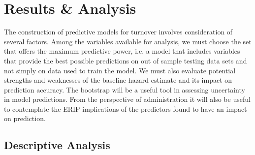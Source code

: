 \documentclass[12pt,letterpaper]{article}
\begin{document}
\section{Results \& Analysis} \label{application}
The construction of predictive models for turnover involves consideration of several factors. Among the variables available for analysis, we must choose the set that offers the maximum predictive power, i.e. a model that includes variables that provide the best possible predictions on out of sample testing data sets and not simply on data used to train the model. We must also evaluate potential strengths and weaknesses of the baseline hazard estimate and its impact on prediction accuracy.  The bootstrap will be a useful tool in assessing uncertainty in model predictions. From the perspective of administration it will also be useful to contemplate the ERIP implications of the predictors found to have an impact on prediction.

\subsection{Descriptive Analysis}
\end{document}
